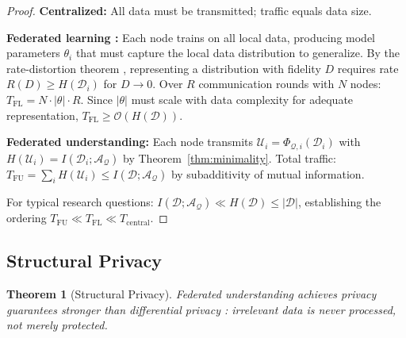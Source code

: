 \documentclass[10pt,twocolumn]{article}
\newtheorem{theorem}{Theorem}[section]
\theoremstyle{definition}
\theoremstyle{remark}
\newcommand{\morphism}{\Phi}
\newcommand{\question}{\mathcal{Q}}
\newcommand{\answer}{\mathcal{A}}
\newcommand{\dataset}{\mathcal{D}}
\newcommand{\params}{\theta}
\newcommand{\understanding}{\mathcal{U}}
\begin{document}
\begin{proof}
\textbf{Centralized:} All data must be transmitted; traffic equals data size.

\textbf{Federated learning \cite{mcmahan2017}:} Each node trains on all local data, producing model parameters $\params_i$ that must capture the local data distribution to generalize. By the rate-distortion theorem \cite{cover2006}, representing a distribution with fidelity $D$ requires rate $R(D) \geq H(\dataset_i)$ for $D \to 0$. Over $R$ communication rounds with $N$ nodes: $T_{\text{FL}} = N \cdot |\params| \cdot R$. Since $|\params|$ must scale with data complexity for adequate representation, $T_{\text{FL}} \geq \mathcal{O}(H(\dataset))$.

\textbf{Federated understanding:} Each node transmits $\understanding_i = \morphism_{\question,i}(\dataset_i)$ with $H(\understanding_i) = I(\dataset_i; \answer_\question)$ by Theorem~\ref{thm:minimality}. Total traffic: $T_{\text{FU}} = \sum_i H(\understanding_i) \leq I(\dataset; \answer_\question)$ by subadditivity of mutual information.

For typical research questions: $I(\dataset; \answer_\question) \ll H(\dataset) \leq |\dataset|$, establishing the ordering $T_{\text{FU}} \ll T_{\text{FL}} \ll T_{\text{central}}$.
\end{proof}

\subsection{Structural Privacy}

\begin{theorem}[Structural Privacy]
\label{thm:privacy}
Federated understanding achieves privacy guarantees stronger than differential privacy \cite{dwork2006}: irrelevant data is never processed, not merely protected.
\end{theorem}
\end{document}
